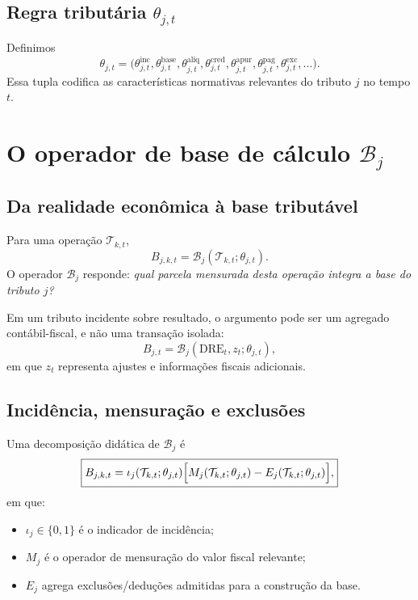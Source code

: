 \documentclass[11pt,a4paper]{article}
\newcommand{\DRE}{\mathrm{DRE}}
\newcommand{\cT}{\mathcal{T}}
\newcommand{\cB}{\mathcal{B}}
\begin{document}
\subsection[Regra tributária theta j,t]{Regra tributária $\theta_{j,t}$}

Definimos
\begin{equation}
\boxed{
\theta_{j,t}=
\bigl(
\theta^{\mathrm{inc}}_{j,t},
\theta^{\mathrm{base}}_{j,t},
\theta^{\mathrm{aliq}}_{j,t},
\theta^{\mathrm{cred}}_{j,t},
\theta^{\mathrm{apur}}_{j,t},
\theta^{\mathrm{pag}}_{j,t},
\theta^{\mathrm{exc}}_{j,t},\ldots
\bigr).
}
\label{eq:theta-tax}
\end{equation}
Essa tupla codifica as características normativas relevantes do tributo $j$ no tempo $t$.

\section[O operador de base de cálculo B j]{O operador de base de cálculo $\mathcal B_j$}

\subsection{Da realidade econômica à base tributável}

Para uma operação $\cT_{k,t}$,
\begin{equation}
\boxed{B_{j,k,t}=\cB_j(\cT_{k,t};\theta_{j,t}).}
\label{eq:B-op}
\end{equation}
O operador $\cB_j$ responde: \emph{qual parcela mensurada desta operação integra a base do tributo $j$?}

Em um tributo incidente sobre resultado, o argumento pode ser um agregado contábil-fiscal, e não uma transação isolada:
\begin{equation}
\boxed{B_{j,t}=\cB_j(\DRE_t,z_t;\theta_{j,t}),}
\label{eq:B-result}
\end{equation}
em que $z_t$ representa ajustes e informações fiscais adicionais.

\subsection{Incidência, mensuração e exclusões}

Uma decomposição didática de $\cB_j$ é
\begin{equation}
\boxed{
B_{j,k,t}
=
\iota_j(\cT_{k,t};\theta_{j,t})
\Bigl[
M_j(\cT_{k,t};\theta_{j,t})
-
E_j(\cT_{k,t};\theta_{j,t})
\Bigr],
}
\label{eq:B-decomp}
\end{equation}
em que:
\begin{itemize}
    \item $\iota_j\in\{0,1\}$ é o indicador de incidência;
    \item $M_j$ é o operador de mensuração do valor fiscal relevante;
    \item $E_j$ agrega exclusões/deduções admitidas para a construção da base.
\end{itemize}
\end{document}
